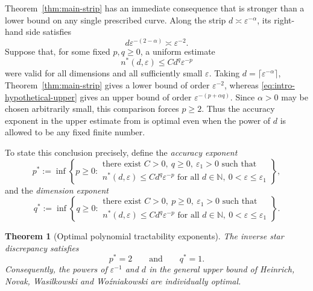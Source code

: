 \documentclass[11pt]{article}
\theoremstyle{plain}
\newtheorem{theorem}{Theorem}[section]
\theoremstyle{remark}
\theoremstyle{definition}
\newcommand{\1}{\mathbf{1}}
\newcommand{\N}{\mathbb{N}}
\begin{document}
Theorem~\ref{thm:main-strip} has an immediate consequence that is stronger than a lower bound on any single prescribed curve.  Along the strip \(d\asymp\varepsilon^{-\alpha}\), its right-hand side satisfies
\[
 d\varepsilon^{-(2-\alpha)}\asymp\varepsilon^{-2}.
\]
Suppose that, for some fixed \(p,q\ge0\), a uniform estimate
\begin{equation}\label{eq:intro-hypothetical-upper}
 n^{\ast}(d,\varepsilon)\le C d^q\varepsilon^{-p}
\end{equation}
were valid for all dimensions and all sufficiently small \(\varepsilon\).  Taking \(d=\lceil\varepsilon^{-\alpha}\rceil\), Theorem~\ref{thm:main-strip} gives a lower bound of order \(\varepsilon^{-2}\), whereas \eqref{eq:intro-hypothetical-upper} gives an upper bound of order \(\varepsilon^{-(p+\alpha q)}\).  Since \(\alpha>0\) may be chosen arbitrarily small, this comparison forces \(p\ge2\).  Thus the accuracy exponent in the upper estimate from \cite{HNWW01} is optimal even when the power of \(d\) is allowed to be any fixed finite number.



To state this conclusion precisely, define the \emph{accuracy exponent}
\begin{equation*}
 p^{\ast}
 :=
 \inf\left\{
 p\ge0:
 \begin{array}{l}
 \text{there exist }C>0,\ q\ge0,\ \varepsilon_1>0\text{ such that}\\
 n^{\ast}(d,\varepsilon)\le C d^q\varepsilon^{-p}
 \text{ for all }d\in\N,\ 0<\varepsilon\le\varepsilon_1
 \end{array}
 \right\},
\end{equation*}
and the \emph{dimension exponent}
\begin{equation*}
 q^{\ast}
 :=
 \inf\left\{
 q\ge0:
 \begin{array}{l}
 \text{there exist }C>0,\ p\ge0,\ \varepsilon_1>0\text{ such that}\\
 n^{\ast}(d,\varepsilon)\le C d^q\varepsilon^{-p}
 \text{ for all }d\in\N,\ 0<\varepsilon\le\varepsilon_1
 \end{array}
 \right\}.
\end{equation*}

\begin{theorem}[Optimal polynomial tractability exponents]\label{thm:tractability-exponents}
The inverse star discrepancy satisfies
\begin{equation*}
 p^{\ast}=2
 \qquad\text{and}\qquad
 q^{\ast}=1.
\end{equation*}
Consequently, the powers of \(\varepsilon^{-1}\) and \(d\) in the general upper bound of Heinrich, Novak, Wasilkowski and Wo\'{z}niakowski \cite{HNWW01} are individually optimal.
\end{theorem}
\end{document}
